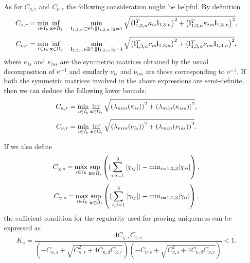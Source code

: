 As for $C_{\kappa, r}$ and $C_{\nu, r}$ the following consideration
might be helpful.
By definition
%
\begin{equation} \label{equationnumber33}
  C_{\kappa, r} = 
    \min_{i \in I_b} \inf_{{\bf x} \in \Omega_i} \quad
    \min_{{\bf l}_{1,3,n} \in \mathbb{R}^3: \| {\bf l}_{1,3,n} \|_2 = 1} 
    \sqrt{\left(
            {\bf l}_{1,3,n}^T \kappa_{is} {\bf l}_{1,3,n}
          \right)^2 
          + 
          \left(
            {\bf l}_{1,3,n}^T \kappa_{iss} {\bf l}_{1,3,n}
          \right)^2},
\end{equation}
%
\begin{equation} \label{equationnumber34}
  C_{\nu, r} = 
    \min_{i \in I_b} \inf_{{\bf x} \in \Omega_i} \quad
    \min_{{\bf l}_{1,3,n} \in \mathbb{R}^3: \| {\bf l}_{1,3,n} \|_2 = 1} 
    \sqrt{\left(
            {\bf l}_{1,3,n}^T \nu_{is} {\bf l}_{1,3,n}
          \right)^2 
          + 
          \left(
            {\bf l}_{1,3,n}^T \nu_{iss} {\bf l}_{1,3,n}
          \right)^2},
\end{equation}
%
where $\kappa_{is}$ and $\kappa_{iss}$ are the symmetric matrices 
obtained by the usual decomposition of $\kappa^{-1}$ and similarly 
$\nu_{is}$ and $\nu_{iss}$ are those corresponding to $\nu^{-1}$. 
If both the symmetric matrices involved in the above expressions are 
semi-definite, then we can deduce the following lower bounds:
%
\begin{equation} \label{equationnumber35}
  C_{\kappa, r} = 
    \min_{i \in I_b} \inf_{{\bf x} \in \Omega_i}
    \sqrt{ \left( \lambda_{min}(\kappa_{is}) \right)^2 
           + 
           \left( \lambda_{min}(\kappa_{iss}) \right)^2},
\end{equation}
%
\begin{equation} \label{equationnumber36}
  C_{\nu, r} = 
    \min_{i \in I_b} \inf_{{\bf x} \in \Omega_i}
    \sqrt{ \left( \lambda_{min}(\nu_{is}) \right)^2 
           + 
           \left( \lambda_{min}(\nu_{iss}) \right)^2}.
\end{equation}
%

If we also define
%
\begin{equation} \label{equationnumber37}
  C_{\chi,s} = 
    \max_{i \in I_b} \sup_{{\bf x} \in \Omega_i} 
      \left((\sum_{i,j=1}^3|\chi_{ij}|)-\mathrm{min}_{i=1,2,3}|\chi_{ii}| \right),
\end{equation}
%
\begin{equation} \label{equationnumber38}
  C_{\gamma,s} = 
    \max_{i \in I_b} \sup_{{\bf x} \in \Omega_i} 
    \left((\sum_{i,j=1}^3|\gamma_{ij}|)-\mathrm{min}_{i=1,2,3}|\gamma_{ii}| \right),
\end{equation}
%
the sufficient condition for the regularity used for proving 
uniqueness can be expressed as
%
\begin{equation} \label{equationnumber39}
  K_{u} = 
  \frac{4 C_{\chi,s} C_{\gamma,s}}{
  \left( -C_{\kappa,s} + \sqrt{C_{\kappa,s}^2+4C_{\kappa,d}C_{\kappa,r}} \right)
  \left( -C_{\nu,s} + \sqrt{C_{\nu,s}^2+4C_{\nu,d}C_{\nu,r}} \right)} < 1.
\end{equation}
%
